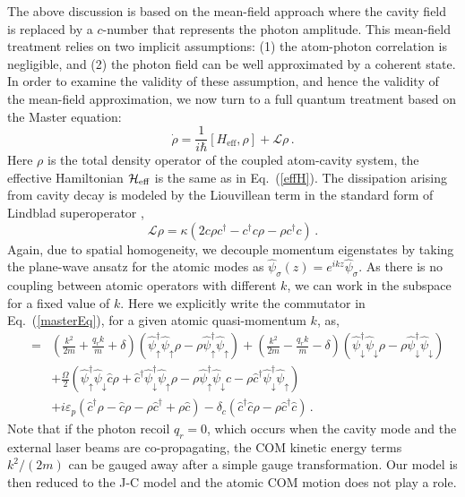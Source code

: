 \documentclass[atoms,article,submit,moreauthors,pdftex,12pt,a4paper]{mdpi}
\def\be{\begin{equation}}
\def\ee{\end{equation}}
\def\ba{\begin{eqnarray}}
\def\ea{\end{eqnarray}}
\begin{document}
The above discussion is based on the mean-field approach where the cavity field is replaced by a $c$-number that represents the photon amplitude. This mean-field treatment relies on two implicit assumptions: (1) the atom-photon correlation is negligible, and (2) the photon field can be well approximated by a coherent state. In order to examine the validity of these assumption, and hence the validity of the mean-field approximation, we now turn to a full quantum treatment based on the Master equation:
\be 
\dot{\rho} = \frac{1}{i\hbar}[H_{\text{eff}},\rho]+\mathcal{L}\rho \,. \label{masterEq}
\ee
Here $\rho$ is the total density operator of the coupled atom-cavity system, the effective Hamiltonian ${\cal H}_{\text{eff}}$ is the same as in Eq.~(\ref{effH}). The dissipation arising from cavity decay is modeled by the Liouvillean term in the 
standard form of Lindblad superoperator \cite{L1, L2},
\be 
\mathcal{L}\rho = \kappa (2c\rho c^\dagger-c^\dagger c\rho-\rho c^\dagger c)\,.\label{Lindblad}
\ee
Again, due to spatial homogeneity, we decouple momentum eigenstates by taking the plane-wave ansatz for the atomic modes as $\hat{\psi}_\sigma({z})=e^{i{k}{z}}\hat{\psi}_\sigma$. As there is no coupling between atomic operators with different $k$, we can work in the subspace for a fixed value of $k$. Here we explicitly write the commutator in Eq.~(\ref{masterEq}), for a given atomic quasi-momentum $k$, as,
\ba
[{\cal H}_{\text{eff}}({k}),\rho] & = & \left(\frac{{ k}^{2}}{2m}+\frac{q_{r}k}{m}+\delta\right)\left(\hat{\psi}_{\uparrow}^{\dagger} \hat{\psi}_{\uparrow}\rho-\rho \hat{\psi}_{\uparrow}^{\dagger} \hat{\psi}_{\uparrow}\right)+\left(\frac{{k}^{2}}{2m}-\frac{q_{r}k}{m}-\delta\right) \left(\hat{\psi}_{\downarrow}^{\dagger} \hat{\psi}_{\downarrow}\rho-\rho \hat{\psi}_{\downarrow}^{\dagger} \hat{\psi}_{\downarrow}\right)\nonumber\\
 &  & + \frac{\Omega}{2}\left(\hat{\psi}_{\uparrow}^{\dagger} \hat{\psi}_{\downarrow} \hat{c} \rho+\hat{c}^{\dagger} \hat{\psi}_{\downarrow}^{\dagger} \hat{\psi}_{\uparrow}\rho-\rho \hat{\psi}_{\uparrow}^{\dagger} \hat{\psi}_{\downarrow}c-\rho \hat{c}^{\dagger} \hat{\psi}_{\downarrow}^{\dagger} \hat{\psi}_{\uparrow}\right)\nonumber\\
&& + i\varepsilon_{p}\left(\hat{c}^{\dagger}\rho-\hat{c}\rho-\rho \hat{c}^{\dagger}+\rho \hat{c}\right)-\delta_{c}\left(\hat{c}^{\dagger}\hat{c}\rho-\rho \hat{c}^{\dagger}\hat{c}\right)\,.
\ea
Note that if the photon recoil $q_r=0$, which occurs when the cavity mode and the external laser beams are co-propagating, the COM kinetic energy terms $k^2/(2m)$ can be gauged away after a simple gauge transformation. Our model is then reduced to the J-C model and the atomic COM motion does not play a role.
\end{document}
